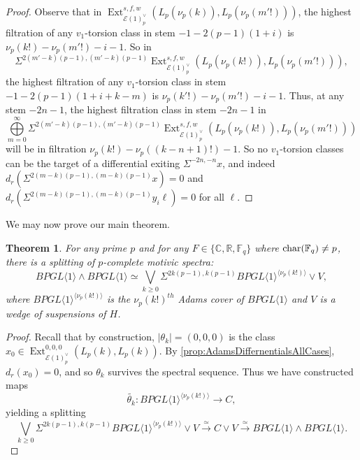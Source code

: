 \documentclass{amsart}
\newtheorem{theorem}{Theorem}[section]
\theoremstyle{plain}
\numberwithin{theorem}{section}
\numberwithin{equation}{section}
\numberwithin{figure}{section}
\DeclareMathOperator{\Ext}{Ext}
\newcommand{\cE}{{\mathcal E}}
\newcommand{\0}{\langle 0 \rangle }
\begin{document}
\begin{proof}
Observe that in $ \Ext^{s,f,w}_{\mathcal{E}(1)_p^\vee}\left(L_p(\nu_{p}(k)), L_p(\nu_{p}(m'!))\right)$, the highest filtration of any $v_{1}$-torsion class in stem $-1-2(p-1)(1+i)$ is $\nu_{p}(k!)-\nu_{p}(m'!)-i-1$. So in \[\Sigma^{2(m'-k)(p-1), (m'-k)(p-1)}\Ext^{s,f,w}_{\cE(1)_p^\vee} \left(L_p (\nu_{p}(k!)), L_p (\nu_{p}(m'!))\right),\] 
the highest filtration of any $v_{1}$-torsion class in stem $-1-2(p-1)(1+i+k-m)$ is $\nu_{p}(k'!)-\nu_{p}(m'!)-i-1$. Thus, at any stem $-2n-1$, the highest filtration class in stem $-2n-1$ in 
\[\bigoplus\limits_{m=0}^{\infty}\Sigma^{2(m'-k)(p-1), (m'-k)(p-1)}\Ext^{s,f,w}_{\cE(1)_p^\vee} \left(L_p (\nu_{p}(k!)), L_p (\nu_{p}(m'!))\right)\]
 will be in filtration $\nu_{p}(k!) - \nu_{p}((k-n+1)!) - 1.$
So no $v_1$-torsion classes can be the target of a differential exiting $\Sigma^{-2n,-n}x$, and indeed $d_r(\Sigma^{2(m-k)(p-1), (m-k)(p-1)}x) = 0$ and $d_r(\Sigma^{2(m-k)(p-1), (m-k)(p-1)}y_i\ell) = 0$ for all $\ell$. 
\end{proof}

We may now prove our main theorem.

\begin{theorem}
\label{thm:BPGL1SplittingAlpha}
    For any prime $p$ and for any $F \in \{\mathbb{C},\mathbb{R}, \mathbb{F}_q\}$ where $\textup{char}(\mathbb{F}_q) \neq p$, there is a splitting of $p$-complete motivic spectra:
    \[BPGL \langle 1 \rangle \wedge BPGL \langle 1 \rangle \simeq \bigvee_{k \geq 0}\Sigma^{2k(p-1), k(p-1)}BPGL \langle 1 \rangle^{\langle\nu_p(k!)\rangle} \vee V,\]
    where $BPGL \langle 1 \rangle^{\langle \nu_p(k!) \rangle}$ is the $\nu_p(k!)^{th}$ Adams cover of $BPGL \langle 1 \rangle$ and $V$ is a wedge of suspensions of $H$.
\end{theorem}

\begin{proof}
Recall that by construction, $|\theta_k| = (0,0,0)$ is the class $x_0 \in \Ext^{0,0,0}_{\mathcal{E}(1)_p^{\vee}}(L_p(k), L_p(k))$. By \cref{prop:AdamsDiffernentialsAllCases}, $d_r(x_0) = 0$, and so $\theta_k$ survives the spectral sequence. Thus we have constructed maps 
\[ \widetilde{\theta_k}: BPGL\langle 1 \rangle ^{\langle\nu_p(k!)\rangle} \to C, \]
yielding a splitting
\[ \bigvee\limits_{k\geq 0}^{}\Sigma^{2k(p-1), k(p-1)}BPGL\langle 1 \rangle ^{\langle\nu_p(k!)\rangle} \vee V \xrightarrow{\simeq} C \vee V \xrightarrow{\simeq} BPGL\langle 1 \rangle \wedge BPGL\langle 1 \rangle.\]

\end{proof}
\end{document}
